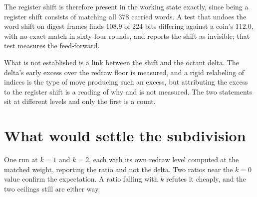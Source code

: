 The register shift is therefore present in the working state exactly, since being a register shift consists of matching all \(378\) carried words. A test that undoes the word shift on digest frames finds \(108.9\) of \(224\) bits differing against a coin's \(112.0\), with no exact match in sixty-four rounds, and reports the shift as invisible; that test measures the feed-forward.

What is not established is a link between the shift and the octant delta. The delta's early excess over the redraw floor is measured, and a rigid relabeling of indices is the type of move producing such an excess, but attributing the excess to the register shift is a reading of why and is not measured. The two statements sit at different levels and only the first is a count.

\section{What would settle the subdivision}

One run at \(k = 1\) and \(k = 2\), each with its own redraw level computed at the matched weight, reporting the ratio and not the delta. Two ratios near the \(k = 0\) value confirm the expectation. A ratio falling with \(k\) refutes it cheaply, and the two ceilings still are either way.
